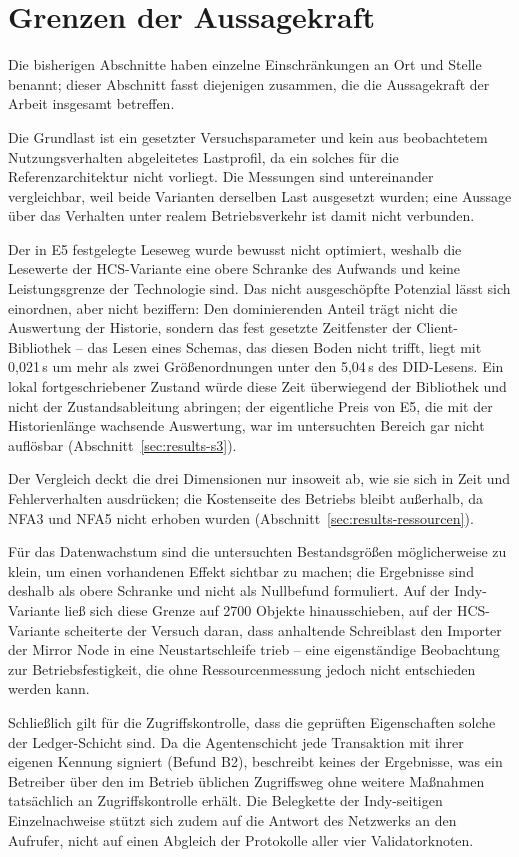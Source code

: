 \section{Grenzen der Aussagekraft}
\label{sec:results-grenzen}

Die bisherigen Abschnitte haben einzelne Einschränkungen an Ort und Stelle benannt; dieser Abschnitt fasst diejenigen zusammen, die die Aussagekraft der Arbeit insgesamt betreffen.

Die Grundlast ist ein gesetzter Versuchsparameter und kein aus beobachtetem Nutzungsverhalten abgeleitetes Lastprofil, da ein solches für die Referenzarchitektur nicht vorliegt. Die Messungen sind untereinander vergleichbar, weil beide Varianten derselben Last ausgesetzt wurden; eine Aussage über das Verhalten unter realem Betriebsverkehr ist damit nicht verbunden.

Der in E5 festgelegte Leseweg wurde bewusst nicht optimiert, weshalb die Lesewerte der HCS-Variante eine obere Schranke des Aufwands und keine Leistungsgrenze der Technologie sind. Das nicht ausgeschöpfte Potenzial lässt sich einordnen, aber nicht beziffern: Den dominierenden Anteil trägt nicht die Auswertung der Historie, sondern das fest gesetzte Zeitfenster der Client-Bibliothek -- das Lesen eines Schemas, das diesen Boden nicht trifft, liegt mit 0,021\,s um mehr als zwei Größenordnungen unter den 5,04\,s des DID-Lesens. Ein lokal fortgeschriebener Zustand würde diese Zeit überwiegend der Bibliothek und nicht der Zustandsableitung abringen; der eigentliche Preis von E5, die mit der Historienlänge wachsende Auswertung, war im untersuchten Bereich gar nicht auflösbar (Abschnitt~\ref{sec:results-s3}).

Der Vergleich deckt die drei Dimensionen nur insoweit ab, wie sie sich in Zeit und Fehlerverhalten ausdrücken; die Kostenseite des Betriebs bleibt außerhalb, da NFA3 und NFA5 nicht erhoben wurden (Abschnitt~\ref{sec:results-ressourcen}).

Für das Datenwachstum sind die untersuchten Bestandsgrößen möglicherweise zu klein, um einen vorhandenen Effekt sichtbar zu machen; die Ergebnisse sind deshalb als obere Schranke und nicht als Nullbefund formuliert. Auf der Indy-Variante ließ sich diese Grenze auf 2700 Objekte hinausschieben, auf der HCS-Variante scheiterte der Versuch daran, dass anhaltende Schreiblast den Importer der Mirror Node in eine Neustartschleife trieb -- eine eigenständige Beobachtung zur Betriebsfestigkeit, die ohne Ressourcenmessung jedoch nicht entschieden werden kann.

Schließlich gilt für die Zugriffskontrolle, dass die geprüften Eigenschaften solche der Ledger-Schicht sind. Da die Agentenschicht jede Transaktion mit ihrer eigenen Kennung signiert (Befund B2), beschreibt keines der Ergebnisse, was ein Betreiber über den im Betrieb üblichen Zugriffsweg ohne weitere Maßnahmen tatsächlich an Zugriffskontrolle erhält. Die Belegkette der Indy-seitigen Einzelnachweise stützt sich zudem auf die Antwort des Netzwerks an den Aufrufer, nicht auf einen Abgleich der Protokolle aller vier Validatorknoten.